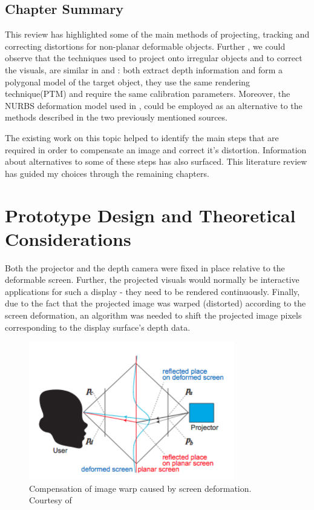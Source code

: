 \documentclass[]{article}
\begin{document}
\subsection{Chapter Summary}

This review has highlighted some of the main methods of projecting, tracking and correcting distortions for non-planar deformable objects. Further , we could observe that the techniques used to project onto irregular objects and to correct the visuals, are similar in \cite{watanabe08} and \cite{raskar98}: both extract depth information and form a polygonal model of the target object, they use the same rendering technique(PTM) and require the same calibration parameters. Moreover, the NURBS deformation model used in \cite{steimle13}, could be employed as an alternative to the methods described in the two previously mentioned sources.

The existing work on this topic helped to identify the main steps that are required in order to compensate an image and correct it's distortion. Information about alternatives to some of these steps has also surfaced. This literature review has guided my choices through the remaining chapters.

\newpage
\section{Prototype Design and Theoretical Considerations}

Both the projector and the depth camera were fixed in place relative to the deformable screen. Further, the projected visuals would normally be interactive applications for such a display - they need to be rendered continuously. Finally, due to the fact that the projected image was warped (distorted) according to the screen deformation, an algorithm was needed to shift the projected image pixels corresponding to the display surface’s depth data. 

\begin{figure}[hbtp]
    \centering
    \includegraphics[width=0.8\textwidth]{figures/PointProjection.PNG}
    \caption{Compensation of image warp caused by screen deformation. Courtesy of \cite{watanabe08}}
    \label{fig:PointCompensation}
\end{figure}
\end{document}
